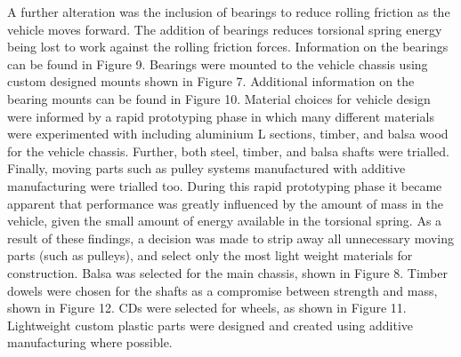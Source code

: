 \documentclass[a4paper]{article}
\begin{document}
A further alteration was the inclusion of bearings to reduce rolling friction as the vehicle moves forward. The addition of bearings reduces torsional spring energy being lost to work against the rolling friction forces. Information on the bearings can be found in Figure 9. Bearings were mounted to the vehicle chassis using custom designed mounts shown in Figure 7. Additional information on the bearing mounts can be found in Figure 10. Material choices for vehicle design were informed by a rapid prototyping phase in which many different materials were experimented with including aluminium L sections, timber, and balsa wood for the vehicle chassis. Further, both steel, timber, and balsa shafts were trialled. Finally, moving parts such as pulley systems manufactured with additive manufacturing were trialled too. During this rapid prototyping phase it became apparent that performance was greatly influenced by the amount of mass in the vehicle, given the small amount of energy available in the torsional spring. As a result of these findings, a decision was made to strip away all unnecessary moving parts (such as pulleys), and select only the most light weight materials for construction. Balsa was selected for the main chassis, shown in Figure 8. Timber dowels were chosen for the shafts as a compromise between strength and mass, shown in Figure 12. CDs were selected for wheels, as shown in Figure 11. Lightweight custom plastic parts were designed and created using additive manufacturing where possible.

\vspace{1cm}
\end{document}
